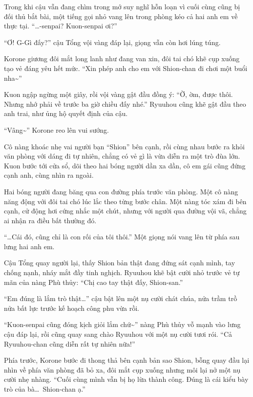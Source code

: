 \documentclass[../main.tex]{subfiles}
\begin{document}
Trong khi cậu vẫn đang chìm trong mớ suy nghĩ hỗn loạn vì cuối cùng cũng bị đối thủ bắt bài, một tiếng gọi nhỏ vang lên trong phòng kéo cả hai anh em về thực tại. ``\dots-senpai? Kuon-senpai ơi?''

``Ơ! G-Gì đấy?'' cậu Tổng vội vàng đáp lại, giọng vẫn còn hơi lúng túng.

Korone giương đôi mắt long lanh như đang van xin, đôi tai chó khẽ cụp xuống tạo vẻ đáng yêu hết mức. ``Xin phép anh cho em với Shion-chan đi chơi một buổi nha\~{}''

Kuon ngập ngừng một giây, rồi vội vàng gật đầu đồng ý: ``Ờ, ờm, được thôi. Nhưng nhớ phải về trước ba giờ chiều đấy nhé.'' Ryuuhou cũng khẽ gật đầu theo anh trai, như ủng hộ quyết định của cậu.

``Vâng\~{}'' Korone reo lên vui sướng.

Cô nàng khoác nhẹ vai người bạn ``Shion'' bên cạnh, rồi cùng nhau bước ra khỏi văn phòng với dáng đi tự nhiên, chẳng có vẻ gì là vừa diễn ra một trò đùa lớn. Kuon bước tới cửa sổ, dõi theo hai bóng người dần xa dần, cô em gái cũng đứng cạnh anh, cùng nhìn ra ngoài.

Hai bóng người đang băng qua con đường phía trước văn phòng. Một cô nàng năng động với đôi tai chó lúc lắc theo từng bước chân. Một nàng tóc xám đi bên cạnh, cử động hơi cứng nhắc một chút, nhưng với người qua đường vội vã, chẳng ai nhận ra điều bất thường đó.

``\dots Cái đó, cũng chỉ là con rối của tôi thôi.'' Một giọng nói vang lên từ phía sau lưng hai anh em.


Cậu Tổng quay người lại, thấy Shion bản thật đang đứng sát cạnh mình, tay chống nạnh, nháy mắt đầy tinh nghịch. Ryuuhou khẽ bật cười nhỏ trước vẻ tự mãn của nàng Phù thủy: ``Chị cao tay thật đấy, Shion-san.''

``Em đúng là lắm trò thật\dots'' cậu bật lên một nụ cười chát chúa, nửa trầm trồ nửa bất lực trước kế hoạch công phu vừa rồi.

``Kuon-senpai cũng đóng kịch giỏi lắm chứ\~{}'' nàng Phù thủy vỗ mạnh vào lưng cậu đáp lại, rồi cũng quay sang chào Ryuuhou với một nụ cười tươi rói. ``Cả Ryuuhou-chan cũng diễn rất tự nhiên nữa!''

Phía trước, Korone bước đi thong thả bên cạnh bản sao Shion, bỗng quay đầu lại nhìn về phía văn phòng đã bỏ xa, đôi mắt cụp xuống nhưng môi lại nở một nụ cười nhẹ nhàng. ``Cuối cùng mình vẫn bị họ lừa thành công. Đúng là cái kiểu bày trò của bà\dots\ Shion-chan ạ.''
\end{document}
